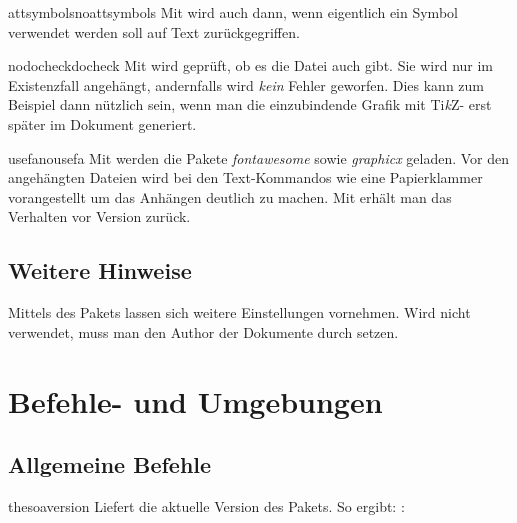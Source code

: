 \documentclass{sopra-base}
\begin{document}
    \begin{argument}{attsymbols}{noattsymbols}
        Mit  wird auch dann, wenn eigentlich ein Symbol verwendet werden
        soll auf Text zurückgegriffen.
    \end{argument}

    \begin{argument}{nodocheck}{docheck}
        Mit  wird geprüft, ob es die Datei auch gibt. Sie wird nur im Existenzfall
        angehängt, andernfalls wird \emph{kein} Fehler geworfen. Dies kann zum Beispiel dann
        nützlich sein, wenn man die einzubindende Grafik mit Ti\textit{k}Z- erst
        später im Dokument generiert.
    \end{argument}

    \begin{argument}{usefa}{nousefa}
        Mit  werden die Pakete \emph{fontawesome} sowie \emph{graphicx} geladen. Vor den angehängten Dateien wird bei den Text-Kommandos wie  eine Papierklammer vorangestellt um das Anhängen deutlich zu machen. Mit  erhält man das Verhalten vor Version  zurück.
    \end{argument}

\subsection{Weitere Hinweise}

    Mittels  des Pakets  lassen sich weitere
    Einstellungen vornehmen. Wird nicht  verwendet, muss man den Author
    der Dokumente durch  setzen.

\section{Befehle- und Umgebungen}

\subsection{Allgemeine Befehle}

\begin{command}{thesoaversion}{}
    Liefert die aktuelle Version des Pakets. So ergibt: : \thesoaversion\\
\end{command}
\end{document}
